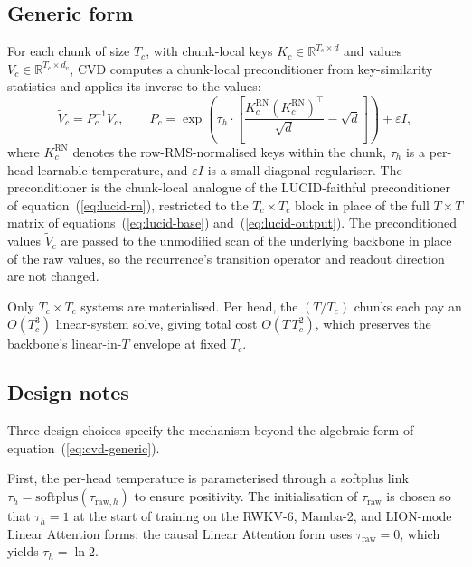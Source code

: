 \subsection{Generic form}

For each chunk of size $T_{c}$, with chunk-local keys
$K_{c} \in \mathbb{R}^{T_{c} \times d}$ and values
$V_{c} \in \mathbb{R}^{T_{c} \times d_{v}}$, CVD computes a
chunk-local preconditioner from key-similarity statistics and
applies its inverse to the values:
\begin{equation}\label{eq:cvd-generic}
\tilde{V}_{c} = P_{c}^{-1} V_{c},
\qquad
P_{c} = \exp\!\left( \tau_{h} \cdot \left[ \frac{K_{c}^{\mathrm{RN}} (K_{c}^{\mathrm{RN}})^{\top}}{\sqrt{d}} - \sqrt{d} \right] \right) + \varepsilon I,
\end{equation}
where $K_{c}^{\mathrm{RN}}$ denotes the row-RMS-normalised keys
within the chunk, $\tau_{h}$ is a per-head learnable temperature,
and $\varepsilon I$ is a small diagonal regulariser. The
preconditioner is the chunk-local analogue of the LUCID-faithful
preconditioner of equation~(\ref{eq:lucid-rn}), restricted to the
$T_{c} \times T_{c}$ block in place of the full $T \times T$
matrix of equations~(\ref{eq:lucid-base})
and~(\ref{eq:lucid-output}). The preconditioned values
$\tilde{V}_{c}$ are passed to the unmodified scan of the
underlying backbone in place of the raw values, so the
recurrence's transition operator and readout direction are not
changed.

Only $T_{c} \times T_{c}$ systems are materialised. Per head, the
$(T / T_{c})$ chunks each pay an $O(T_{c}^{3})$ linear-system
solve, giving total cost $O(T \, T_{c}^{2})$, which preserves the
backbone's linear-in-$T$ envelope at fixed $T_{c}$.

\subsection{Design notes}

Three design choices specify the mechanism beyond the algebraic
form of equation~(\ref{eq:cvd-generic}).

First, the per-head temperature is parameterised through a
softplus link
$\tau_{h} = \mathrm{softplus}(\tau_{\mathrm{raw}, h})$ to ensure
positivity. The initialisation of $\tau_{\mathrm{raw}}$ is chosen
so that $\tau_{h} = 1$ at the start of training on the RWKV-6,
Mamba-2, and LION-mode Linear Attention forms; the causal Linear
Attention form uses $\tau_{\mathrm{raw}} = 0$, which yields
$\tau_{h} = \ln 2$.

